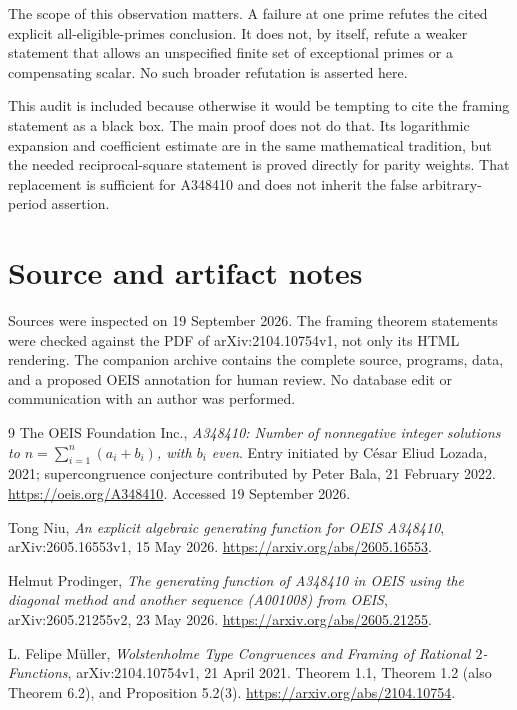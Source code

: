 \documentclass[11pt,a4paper]{article}
\numberwithin{equation}{section}
\theoremstyle{definition}
\theoremstyle{remark}
\begin{document}
The scope of this observation matters. A failure at one prime refutes
the cited explicit all-eligible-primes conclusion. It does not, by
itself, refute a weaker statement that allows an unspecified finite set
of exceptional primes or a compensating scalar. No such broader
refutation is asserted here.

This audit is included because otherwise it would be tempting to cite
the framing statement as a black box. The main proof does not do that.
Its logarithmic expansion and coefficient estimate are in the same
mathematical tradition, but the needed reciprocal-square statement is
proved directly for parity weights. That replacement is sufficient for
A348410 and does not inherit the false arbitrary-period assertion.

\section{Source and artifact notes}\label{app:artifacts}

Sources were inspected on 19 September 2026. The framing theorem
statements were checked against the PDF of arXiv:2104.10754v1, not only
its HTML rendering. The companion archive contains the complete source,
programs, data, and a proposed OEIS annotation for human review. No
database edit or communication with an author was performed.

\begin{thebibliography}{9}
The OEIS Foundation Inc.,
\emph{A348410: Number of nonnegative integer solutions to
$n=\sum_{i=1}^{n}(a_i+b_i)$, with $b_i$ even}.
Entry initiated by C\'esar Eliud Lozada, 2021; supercongruence conjecture
contributed by Peter Bala, 21 February 2022.
\url{https://oeis.org/A348410}. Accessed 19 September 2026.

Tong Niu,
\emph{An explicit algebraic generating function for OEIS A348410},
arXiv:2605.16553v1, 15 May 2026.
\url{https://arxiv.org/abs/2605.16553}.

Helmut Prodinger,
\emph{The generating function of A348410 in OEIS using the diagonal
method and another sequence (A001008) from OEIS},
arXiv:2605.21255v2, 23 May 2026.
\url{https://arxiv.org/abs/2605.21255}.

L. Felipe M\"uller,
\emph{Wolstenholme Type Congruences and Framing of Rational
$2$-Functions}, arXiv:2104.10754v1, 21 April 2021.
Theorem 1.1, Theorem 1.2 (also Theorem 6.2), and Proposition 5.2(3).
\url{https://arxiv.org/abs/2104.10754}.
\end{thebibliography}
\end{document}
